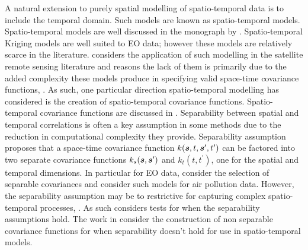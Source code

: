 A natural extension to purely spatial modelling of spatio-temporal data is to include the temporal domain.
Such models are known as spatio-temporal models.
Spatio-temporal models are well discussed in the monograph \cite{cressie_statistics_2011} by \citeauthor{cressie_statistics_2011}.
Spatio-temporal Kriging models are well suited to EO data; however these models are relatively scarce in the literature.
\citeauthor{militino_introduction_2018} considers the application of such modelling in the satellite remote sensing literature and reasons the lack of them is primarily due to the added complexity these models produce in specifying valid space-time covariance functions, \cite{militino_introduction_2018}.
As such, one particular direction spatio-temporal modelling has considered is the creation of spatio-temporal covariance functions.
Spatio-temporal covariance functions are discussed in \citep{cressie_statistics_2011}.
Separability between spatial and temporal correlations is often a key assumption in some methods due to the reduction in computational complexity they provide.
Separability assumption proposes that a space-time covariance function $k(\bm{{s}}, t, \bm{{s}}^\prime, t^\prime)$ can be factored into two separate covariance functions $k_{s}(\bm{{s}}, \bm{{s}}^\prime)$ and $k_t(t, t^\prime)$, one for the spatial and temporal dimensions. 
In particular for EO data, \cite{george_selecting_2015} consider the selection of separable covariances and \cite{deb_spatio-temporal_2017} consider such models for air pollution data. 
However, the separability assumption may be to restrictive for capturing complex spatio-temporal processes, \citep{cressie_statistics_2011}. 
As such \citep{mitchell_likelihood_2006, fuentes_testing_2006, aston_tests_2017} considers tests for when the separability assumptions hold.
The work in \citep{cressie_classes_1999, gneiting_nonseparable_2002, iaco_nonseparable_2002} consider the construction of non separable covariance functions for when separability doesn't hold for use in spatio-temporal models.

